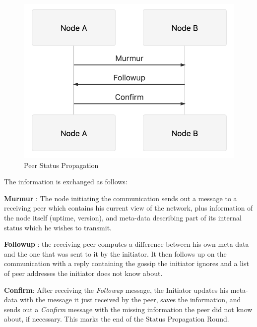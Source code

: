 \begin{figure}
\includegraphics[scale=0.25]{peerprop}
\caption{Peer Status Propagation}
\label{peerprop}
\end{figure}

The information is exchanged as follows:

\textbf{Murmur} : The node initiating the communication sends out a
message to a receiving peer which contains his current view of the
network, plus information of the node itself (uptime, version), and
meta-data describing part of its internal status which he wishes to
transmit.

\textbf{Followup} : the receiving peer computes a difference between his
own meta-data and the one that was sent to it by the initiator. It then
follows up on the communication with a reply containing the gossip the
initiator ignores and a list of peer addresses the initiator does not
know about.

\textbf{Confirm}: After receiving the \emph{Followup} message, the
Initiator updates his meta-data with the message it just received by the
peer, saves the information, and sends out a \emph{Confirm} message with
the missing information the peer did not know about, if necessary. This
marks the end of the Status Propagation Round.

